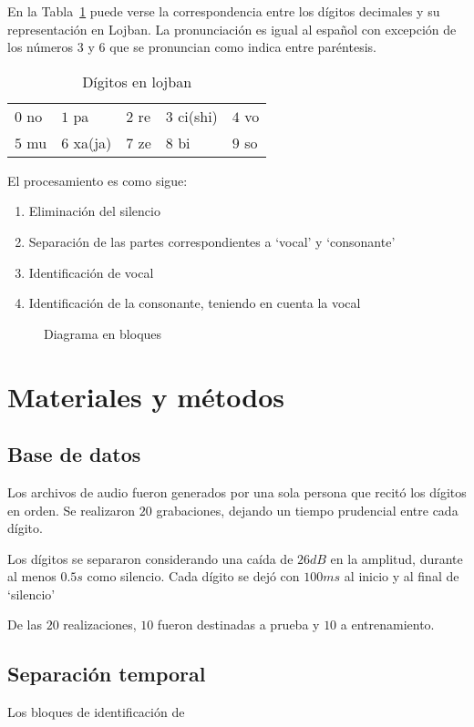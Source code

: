 \documentclass[conference,a4paper,10pt,oneside,final]{tfmpd}
\begin{document}
	En la Tabla~\ref{tab:digitos} puede verse la correspondencia entre los dígitos decimales
	y su representación en Lojban. La pronunciación es igual al español
	con excepción de los números $3$ y $6$ que se pronuncian como indica
	entre paréntesis.

	\begin{table}[h]
		\center
		\begin{tabular}{lllll}
			$0$ no & $1$ pa & $2$ re & $3$ ci(shi) & $4$ vo\\
			$5$ mu & $6$ xa(ja) & $7$ ze & $8$ bi & $9$ so\\
		\end{tabular}
		\caption{Dígitos en lojban}
		\label{tab:digitos}
	\end{table}


   	 El procesamiento es como sigue:
   	 \begin{enumerate}
   		 \item Eliminación del silencio
   		 \item Separación de las partes correspondientes a `vocal' y `consonante'
   		 \item Identificación de vocal
   		 \item Identificación de la consonante, teniendo en cuenta la vocal
   	 \end{enumerate}
	 \begin{figure}
		\resizebox{0.4\textwidth}{!}{
			
		}
		\caption{Diagrama en bloques}
	 \end{figure}
	

\section{Materiales y métodos}
	\subsection{Base de datos}
		Los archivos de audio fueron generados por una sola persona que recitó los dígitos en orden.
		Se realizaron $20$ grabaciones, dejando un tiempo prudencial entre cada dígito.

		Los dígitos se separaron considerando una caída de $26dB$ en la amplitud, durante al menos
		$0.5s$ como silencio. Cada dígito se dejó con $100ms$ al inicio y al final de `silencio'

		De las $20$ realizaciones, $10$ fueron destinadas a prueba y $10$ a entrenamiento.

	\subsection{Separación temporal}
		Los bloques de identificación de 
		
\end{document}
